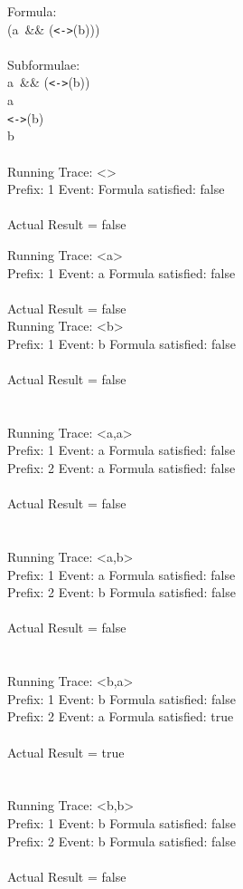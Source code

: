 Formula:\\
(a\ \&\& (\texttt{<->}(b)))\\
\\
Subformulae:\\
a\ \&\& (\texttt{<->}(b))\\
a\\
\texttt{<->}(b)\\
b\\
\\
Running Trace: \textless \textgreater\\
  Prefix: 1 Event:  Formula satisfied: false\\
\\
Actual Result = false\\

\newpage

\noindent Running Trace: \textless a\textgreater\\
  Prefix: 1 Event: a Formula satisfied: false\\
\\
Actual Result = false\\

\noindent Running Trace: \textless b\textgreater\\
  Prefix: 1 Event: b Formula satisfied: false\\
\\
Actual Result = false\\
\\
\\
Running Trace: \textless a,a\textgreater\\
  Prefix: 1 Event: a Formula satisfied: false\\
  Prefix: 2 Event: a Formula satisfied: false\\
\\
Actual Result = false\\
\\
\\
Running Trace: \textless a,b\textgreater\\
  Prefix: 1 Event: a Formula satisfied: false\\
  Prefix: 2 Event: b Formula satisfied: false\\
\\
Actual Result = false\\
\\
\\
Running Trace: \textless b,a\textgreater\\
  Prefix: 1 Event: b Formula satisfied: false\\
  Prefix: 2 Event: a Formula satisfied: true\\
\\
Actual Result = true\\
\\
\\
Running Trace: \textless b,b\textgreater\\
  Prefix: 1 Event: b Formula satisfied: false\\
  Prefix: 2 Event: b Formula satisfied: false\\
\\
Actual Result = false\\

